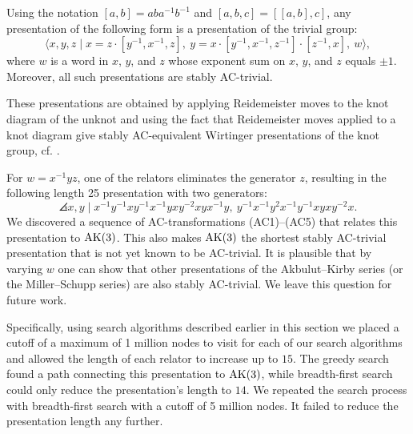 \begin{theorem*}\label{theorem:MMS}
	Using the notation $[a, b] = a b a^{-1} b^{-1}$ and $[a, b, c] = [[a, b], c]$, any presentation of the following form is a presentation of the trivial group:
	\[
	\langle x, y, z \mid x = z \cdot [y^{-1}, x^{-1}, z],\ y = x \cdot [y^{-1}, x^{-1}, z^{-1}] \cdot [z^{-1}, x],\ w \rangle,
	\]
	where $w$ is a word in $x$, $y$, and $z$ whose exponent sum on $x$, $y$, and $z$ equals $\pm 1$. Moreover, all such presentations are stably AC-trivial.
\end{theorem*}

These presentations are obtained by applying Reidemeister moves to the knot diagram of the unknot and using the fact that Reidemeister moves applied to a knot diagram give stably AC-equivalent Wirtinger presentations of the knot group, cf. \cite{WADA1994241}.

For $w = x^{-1}yz$, one of the relators eliminates the generator $z$, resulting in the following length 25 presentation with two generators:
\[
\angles{ x, y \mid
	x^{-1}y^{-1}xy^{-1}x^{-1}yxy^{-2}xyx^{-1}y, \
	y^{-1}x^{-1}y^2x^{-1}y^{-1}xyxy^{-2}x }.
\]
We discovered a sequence of AC-transformations (AC1)--(AC5) that relates this presentation to $\text{AK}(3)$.
This also makes $\text{AK}(3)$ the shortest stably AC-trivial presentation that is not yet known to be AC-trivial.
It is plausible that by varying $w$ one can show that other presentations of the Akbulut--Kirby series (or the Miller--Schupp series) are also stably AC-trivial.
We leave this question for future work.

Specifically, using search algorithms described earlier in this section we placed a cutoff of a maximum of 1 million nodes to visit for each of our search algorithms and allowed the length of each relator to increase up to $15$.
The greedy search found a path connecting this presentation to $\text{AK}(3)$, while breadth-first search could only reduce the presentation's length to $14$.
We repeated the search process with breadth-first search with a cutoff of 5 million nodes.
It failed to reduce the presentation length any further.

